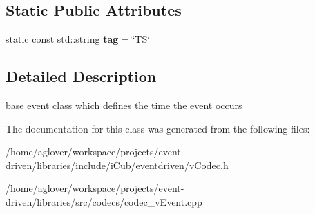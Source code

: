 \subsection*{Static Public Attributes}
\begin{DoxyCompactItemize}
\item 
static const std\+::string {\bfseries tag} = \char`\"{}TS\char`\"{}\hypertarget{classev_1_1vEvent_a54bcc0830c5993b56f1f47e23df1de8e}{}\label{classev_1_1vEvent_a54bcc0830c5993b56f1f47e23df1de8e}

\end{DoxyCompactItemize}


\subsection{Detailed Description}
base event class which defines the time the event occurs 

The documentation for this class was generated from the following files\+:\begin{DoxyCompactItemize}
\item 
/home/aglover/workspace/projects/event-\/driven/libraries/include/i\+Cub/eventdriven/v\+Codec.\+h\item 
/home/aglover/workspace/projects/event-\/driven/libraries/src/codecs/codec\+\_\+v\+Event.\+cpp\end{DoxyCompactItemize}
